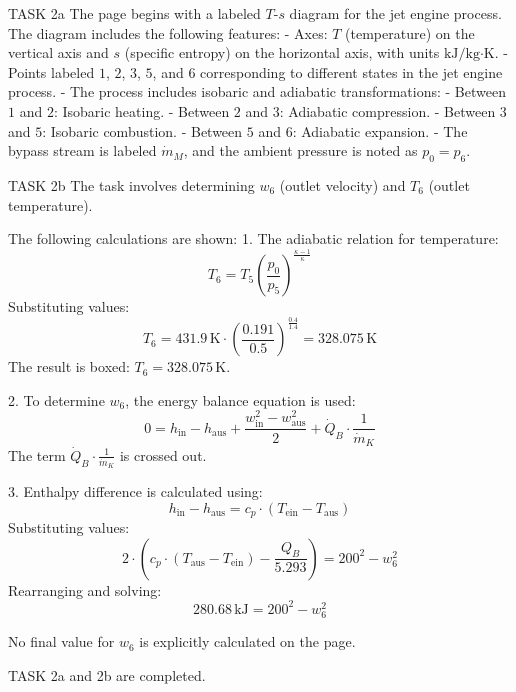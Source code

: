 TASK 2a  
The page begins with a labeled \( T \)-\( s \) diagram for the jet engine process. The diagram includes the following features:  
- Axes: \( T \) (temperature) on the vertical axis and \( s \) (specific entropy) on the horizontal axis, with units \( \text{kJ/kg·K} \).  
- Points labeled \( 1 \), \( 2 \), \( 3 \), \( 5 \), and \( 6 \) corresponding to different states in the jet engine process.  
- The process includes isobaric and adiabatic transformations:  
  - Between \( 1 \) and \( 2 \): Isobaric heating.  
  - Between \( 2 \) and \( 3 \): Adiabatic compression.  
  - Between \( 3 \) and \( 5 \): Isobaric combustion.  
  - Between \( 5 \) and \( 6 \): Adiabatic expansion.  
- The bypass stream is labeled \( \dot{m}_M \), and the ambient pressure is noted as \( p_0 = p_6 \).  

TASK 2b  
The task involves determining \( w_6 \) (outlet velocity) and \( T_6 \) (outlet temperature).  

The following calculations are shown:  
1. The adiabatic relation for temperature:  
   \[
   T_6 = T_5 \left( \frac{p_0}{p_5} \right)^{\frac{\kappa - 1}{\kappa}}
   \]  
   Substituting values:  
   \[
   T_6 = 431.9 \, \text{K} \cdot \left( \frac{0.191}{0.5} \right)^{\frac{0.4}{1.4}} = 328.075 \, \text{K}
   \]  
   The result is boxed: \( T_6 = 328.075 \, \text{K} \).  

2. To determine \( w_6 \), the energy balance equation is used:  
   \[
   0 = h_{\text{in}} - h_{\text{aus}} + \frac{w_{\text{in}}^2 - w_{\text{aus}}^2}{2} + \dot{Q}_B \cdot \frac{1}{\dot{m}_K}
   \]  
   The term \( \dot{Q}_B \cdot \frac{1}{\dot{m}_K} \) is crossed out.  

3. Enthalpy difference is calculated using:  
   \[
   h_{\text{in}} - h_{\text{aus}} = c_p \cdot (T_{\text{ein}} - T_{\text{aus}})
   \]  
   Substituting values:  
   \[
   2 \cdot \left( c_p \cdot (T_{\text{aus}} - T_{\text{ein}}) - \frac{Q_B}{5.293} \right) = 200^2 - w_6^2
   \]  
   Rearranging and solving:  
   \[
   280.68 \, \text{kJ} = 200^2 - w_6^2
   \]  

No final value for \( w_6 \) is explicitly calculated on the page.  

TASK 2a and 2b are completed.